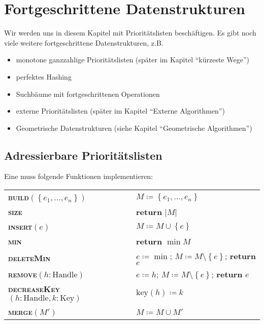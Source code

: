 \chapter{Fortgeschrittene Datenstrukturen}

Wir werden uns in diesem Kapitel mit Prioritätslisten beschäftigen. Es gibt noch viele weitere fortgeschrittene Datenstrukturen, z.B.
\begin{itemize}
  \item monotone ganzzahlige Prioritätslisten (später im Kapitel ``kürzeste Wege'')
  \item perfektes Hashing
  \item Suchbäume mit fortgeschrittenen Operationen
  \item externe Prioritätslisten (später im Kapitel ``Externe Algorithmen'')
  \item Geometrische Datenstrukturen (siehe Kapitel ``Geometrische Algorithmen'')
\end{itemize}

\section{Adressierbare Prioritätslisten}

Eine  muss folgende Funktionen implementieren:

\begin{pseudocode}
  \begin{tabular}{ll}
    \textbf{\textsc{build}}\( (\left \{ e_1,\dots,e_n \right \}) \) & \( M \coloneqq \left \{ e_1,\dots,e_n \right \} \) \\
    \textbf{\textsc{size}} & \textbf{return} \( \left\vert M \right\vert \) \\
    \textbf{\textsc{insert}}\( (e) \) & \( M \coloneqq M \cup \left \{ e \right \} \) \\
    \textbf{\textsc{min}} & \textbf{return} \( \min M \) \\
    \textbf{\textsc{deleteMin}} & \( e \coloneqq \min \); \enskip{} \( M \coloneqq M \setminus \left \{ e \right \} \); \enskip{} \textbf{return} \( e \) \\
    \textbf{\textsc{remove}}\( (h : \text{Handle}) \) & \( e \coloneqq h \); \enskip{} \( M \coloneqq M \setminus \left \{ e \right \} \); \enskip{} \textbf{return} \( e \) \\
    \textbf{\textsc{decreaseKey}}\( (h : \text{Handle}, k : \text{Key}) \) & \( \text{key}(h) \coloneqq k \) \\
    \textbf{\textsc{merge}}\( (M') \) & \( M \coloneqq M \cup M' \)
  \end{tabular}
\end{pseudocode}

